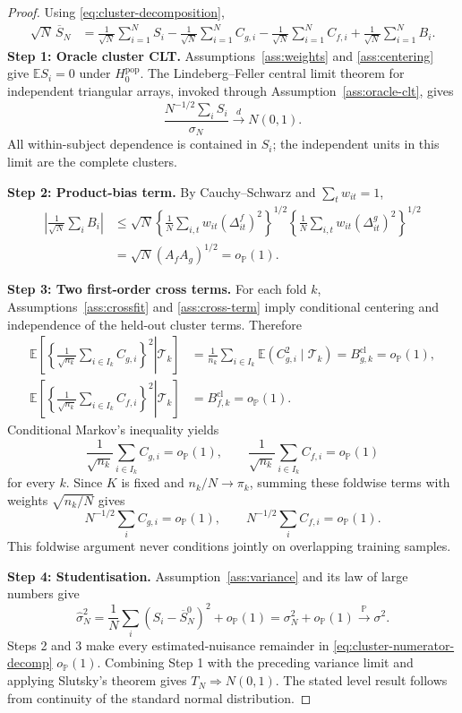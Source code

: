 \documentclass[11pt]{article}
\theoremstyle{definition}
\newcommand{\E}{\mathbb{E}}
\newcommand{\op}{o_{\mathbb{P}}}
\newcommand{\calT}{\mathcal{T}}
\begin{document}
\begin{proof}
Using \eqref{eq:cluster-decomposition},
\begin{align}
\sqrt N\,\overline S_N
&=
\frac1{\sqrt N}\sum_{i=1}^NS_i
-
\frac1{\sqrt N}\sum_{i=1}^NC_{g,i}
-
\frac1{\sqrt N}\sum_{i=1}^NC_{f,i}
+
\frac1{\sqrt N}\sum_{i=1}^NB_i.
\label{eq:cluster-numerator-decomp}
\end{align}
\textbf{Step 1: Oracle cluster CLT.}
Assumptions~\ref{ass:weights} and \ref{ass:centering} give $\E S_i=0$ under
$H_0^{\mathrm{pop}}$. The Lindeberg--Feller central limit theorem for independent triangular
arrays, invoked through Assumption~\ref{ass:oracle-clt}, gives
\[
\frac{N^{-1/2}\sum_iS_i}{\sigma_N}\xrightarrow{d}N(0,1).
\]
All within-subject dependence is contained in $S_i$; the independent units in this limit are
the complete clusters.

\textbf{Step 2: Product-bias term.}
By Cauchy--Schwarz and $\sum_t w_{it}=1$,
\begin{align*}
\left|\frac1{\sqrt N}\sum_iB_i\right|
&\leq
\sqrt N
\left\{
\frac1N\sum_{i,t}w_{it}(\Delta^f_{it})^2
\right\}^{1/2}
\left\{
\frac1N\sum_{i,t}w_{it}(\Delta^g_{it})^2
\right\}^{1/2}\\
&=\sqrt N(A_fA_g)^{1/2}=\op(1).
\end{align*}

\textbf{Step 3: Two first-order cross terms.}
For each fold $k$, Assumptions~\ref{ass:crossfit} and \ref{ass:cross-term} imply conditional
centering and independence of the held-out cluster terms. Therefore
\begin{align*}
\E\left[\left.
\left\{\frac1{\sqrt{n_k}}\sum_{i\in I_k}C_{g,i}\right\}^2
\right|\calT_k\right]
&=\frac1{n_k}\sum_{i\in I_k}\E(C_{g,i}^2\mid\calT_k)
=B_{g,k}^{\mathrm{cl}}=\op(1),\\
\E\left[\left.
\left\{\frac1{\sqrt{n_k}}\sum_{i\in I_k}C_{f,i}\right\}^2
\right|\calT_k\right]
&=B_{f,k}^{\mathrm{cl}}=\op(1).
\end{align*}
Conditional Markov's inequality yields
\[
\frac1{\sqrt{n_k}}\sum_{i\in I_k}C_{g,i}=\op(1),
\qquad
\frac1{\sqrt{n_k}}\sum_{i\in I_k}C_{f,i}=\op(1)
\]
for every $k$. Since $K$ is fixed and $n_k/N\to\pi_k$, summing these foldwise terms with
weights $\sqrt{n_k/N}$ gives
\[
N^{-1/2}\sum_iC_{g,i}=\op(1),
\qquad
N^{-1/2}\sum_iC_{f,i}=\op(1).
\]
This foldwise argument never conditions jointly on overlapping training samples.

\textbf{Step 4: Studentisation.}
Assumption~\ref{ass:variance} and its law of large numbers give
\[
\widehat\sigma_N^2
=\frac1N\sum_i(S_i-\overline S_N^0)^2+\op(1)
=\sigma_N^2+\op(1)
\xrightarrow{\mathbb P}\sigma^2.
\]
Steps 2 and 3 make every estimated-nuisance remainder in
\eqref{eq:cluster-numerator-decomp} $\op(1)$. Combining Step 1 with the preceding variance
limit and applying Slutsky's theorem gives $T_N\Rightarrow N(0,1)$. The stated level result
follows from continuity of the standard normal distribution.
\end{proof}
\end{document}
